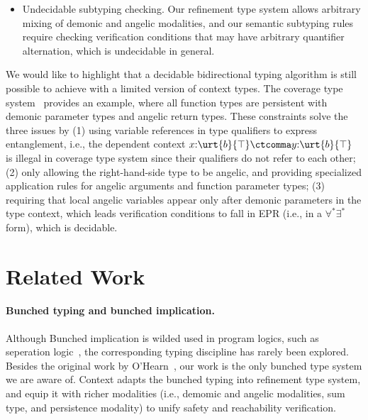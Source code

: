\begin{itemize}
\begin{align*}
        \\&\quad \zlet{x}{e_x}{f\;x} : \ort{\Nat}{\vnu > 0} \ctoplus \ort{\Nat}{\top}
    \end{align*}\noindent
    In fact, whether the binding expression $e_x$ should be typed demonic or angelic depends on the body expression in the let-binding rather than on the right-hand-side type. This makes building a decidable typing algorithm require analyzing the continuation, which can be arbitrarily complex.
    \item Undecidable subtyping checking. Our refinement type system allows arbitrary mixing of demonic and angelic modalities, and our semantic subtyping rules require checking verification conditions that may have arbitrary quantifier alternation, which is undecidable in general.
\end{itemize}

We would like to highlight that a decidable bidirectional typing algorithm is still possible to achieve with a limited version of context types. The coverage type system~\cite{CoverageType} provides an example, where all function types are persistent with demonic parameter types and angelic return types. These constraints solve the three issues by (1) using variable references in type qualifiers to express entanglement, i.e., the dependent context $x{:}\urt{b}{\top} \ctcomma y{:}\urt{b}{\top}$ is illegal in coverage type system since their qualifiers do not refer to each other; (2) only allowing the right-hand-side type to be angelic, and providing specialized application rules for angelic arguments and function parameter types; (3) requiring that local angelic variables appear only after demonic parameters in the type context, which leads verification conditions to fall in EPR (i.e., in a $\forall^*\exists^*$ form), which is decidable.

\section{Related Work}\label{sec:related}

\paragraph{Bunched typing and bunched implication.}
Although Bunched implication is wilded used in program logics, such as seperation logic~\cite{Iris}, the corresponding typing discipline has rarely been explored. Besides the original work by O'Hearn~\cite{BunchedType}, our work is the only bunched type system we are aware of. Context adapts the bunched typing into refinement type system, and equip it with richer modalities (i.e., demomic and angelic modalities, sum type, and persistence modality) to unify safety and reachability verification.

